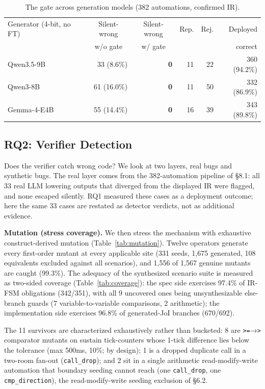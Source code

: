 \documentclass[sigconf,nonacm,anonymous,review]{acmart}
\begin{document}
\begin{table}[t]
\centering
\caption{The gate across generation models (382 automations, confirmed IR).}
\label{tab:models}
\small
\begin{tabular}{lrrrrr}
\toprule
Generator (4-bit, no FT) & \multicolumn{1}{c}{Silent-wrong} & \multicolumn{1}{c}{Silent-wrong} & Rep. & Rej. & Deployed \\
 & \multicolumn{1}{c}{w/o gate} & \multicolumn{1}{c}{w/ gate} & & & correct \\
\midrule
Qwen3.5-9B  & 33 (8.6\%)  & \textbf{0} & 11 & 22 & 360 (94.2\%) \\
Qwen3-8B    & 61 (16.0\%) & \textbf{0} & 11 & 50 & 332 (86.9\%) \\
Gemma-4-E4B & 55 (14.4\%) & \textbf{0} & 16 & 39 & 343 (89.8\%) \\
\bottomrule
\end{tabular}
\end{table}

\subsection{RQ2: Verifier Detection}

Does the verifier catch wrong code? We look at two layers, real bugs and synthetic bugs. The real layer comes from the 382-automation pipeline of \S8.1: all 33 real LLM lowering outputs that diverged from the displayed IR were flagged, and none escaped silently. RQ1 measured these cases as a deployment outcome; here the same 33 cases are restated as detector verdicts, not as additional evidence.

\textbf{Mutation (stress coverage).} We then stress the mechanism with exhaustive construct-derived mutation (Table~\ref{tab:mutation}). Twelve operators generate every first-order mutant at every applicable site (331 seeds, 1,675 generated, 108 equivalents excluded against all scenarios), and 1,556 of 1,567 genuine mutants are caught (99.3\%). The adequacy of the synthesized scenario suite is measured as two-sided coverage (Table~\ref{tab:coverage}): the spec side exercises 97.4\% of IR-FSM obligations (342/351), with all 9 uncovered ones being unsynthesizable else-branch guards (7 variable-to-variable comparisons, 2 arithmetic); the implementation side exercises 96.8\% of generated-JoI branches (670/692).

The 11 survivors are characterized exhaustively rather than bucketed: 8 are \texttt{>=}→\texttt{>} comparator mutants on sustain tick-counters whose 1-tick difference lies below the tolerance (max 500ms, 10\%; by design); 1 is a dropped duplicate call in a two-room fan-out (\texttt{call\_drop}); and 2 sit in a single arithmetic read-modify-write automation that boundary seeding cannot reach (one \texttt{call\_drop}, one \texttt{cmp\_direction}), the read-modify-write seeding exclusion of \S6.2.
\end{document}
